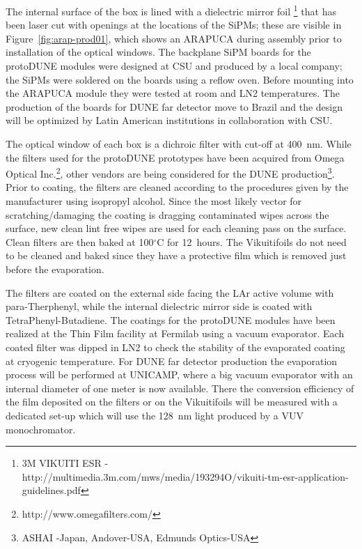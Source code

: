 The internal surface of the box is lined with a dielectric mirror foil \footnote{3M VIKUITI ESR - http://multimedia.3m.com/mws/media/193294O/vikuiti-tm-esr-application-guidelines.pdf} that has been laser cut with openings at the locations of the SiPMs; these are visible in Figure~\ref{fig:arap-prod01}, which shows an ARAPUCA during assembly prior to installation of the optical windows. The backplane SiPM boards for the protoDUNE modules were designed at CSU and produced by a local company; the SiPMs were soldered on the boards using a reflow oven. Before mounting into the ARAPUCA module they were tested at room and LN2 temperatures. The production of the boards for DUNE far detector  move to Brazil and the design will be optimized by Latin American institutions in collaboration with CSU.

The optical window of each box is a dichroic filter with cut-off at \SI{400}{nm}. While the filters used for the protoDUNE prototypes have been acquired from Omega Optical Inc.\footnote{http://www.omegafilters.com/}, other vendors are being considered for the DUNE production\footnote{ASHAI -Japan, Andover-USA, Edmunds Optics-USA}.
Prior to coating, the filters are cleaned according to the procedures given by the manufacturer using isopropyl alcohol. Since the most likely vector for scratching/damaging the coating is dragging contaminated wipes across the surface, new clean lint free wipes are used for each  cleaning pass on the surface. Clean filters are then baked at 100$^\circ$C for \SI{12}{hours}. The Vikuiti\textregistered foils do not need to be cleaned and baked since they have a protective film which is removed just before the evaporation.
   
The filters are coated on the external side facing the LAr active volume with para-Therphenyl, while the internal dielectric mirror side is coated with TetraPhenyl-Butadiene. The coatings for the protoDUNE modules have been realized at the Thin Film facility at Fermilab using a vacuum evaporator. Each coated filter was dipped in LN2 to check the stability of the evaporated coating at cryogenic temperature. For DUNE far detector production the evaporation process will be performed at UNICAMP, where a big vacuum evaporator with an internal diameter of one meter is now available. There the conversion efficiency of the film deposited on the filters or on the Vikuiti\textregistered foils will be measured with a dedicated set-up which will use the \SI{128}{nm} light produced by a VUV monochromator.




